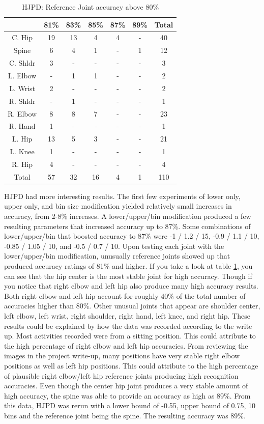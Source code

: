 \documentclass[11pt,nocopyrightspace]{config}
\begin{document}
\begin{table}[t]
\caption{HJPD: Reference Joint accuracy above 80\%}
\centering
\begin{tabular}{c c c c c c c}
\hline\hline
 & 81\% & 83\% & 85\% & 87\% & 89\% & Total \\ [0.5ex]
\hline
C. Hip & 19 & 13 & 4 & 4 & - & 40 \\
Spine & 6 & 4 & 1 & - & 1 & 12 \\
C. Shldr & 3 & - & - & - & - & 3 \\
L. Elbow & - & 1 & 1 & - & - & 2 \\
L. Wrist & 2 & - & - & - & - & 2 \\
R. Shldr & - & 1 & - & - & - & 1 \\
R. Elbow & 8 & 8 & 7 & - & - & 23 \\
R. Hand & 1 & - & - & - & - & 1 \\
L. Hip & 13 & 5 & 3 & - & - & 21 \\
L. Knee & 1 & - & - & - & - & 1 \\
R. Hip & 4 & - & - & - & - & 4 \\
\hline\hline
Total & 57 & 32 & 16 &  4 & 1 & 110 \\
\hline
\end{tabular}
\label{table:hjpdResult}
\end{table}

HJPD had more interesting results. The first few experiments of lower only, upper only, and bin size modification yielded relatively small increases in accuracy, from 2-8\% increases. A lower/upper/bin modification produced a few resulting parameters that increased accuracy up to 87\%. Some combinations of lower/upper/bin that boosted accuracy to 87\% were -1 / 1.2 / 15, -0.9 / 1.1 / 10, -0.85 / 1.05 / 10, and -0.5 / 0.7 / 10. Upon testing each joint with the lower/upper/bin modification, unusually reference joints showed up that produced accuracy ratings of 81\% and higher. If you take a look at table \ref{table:hjpdResult}, you can see that the hip center is the most stable joint for high accuracy. Though if you notice that right elbow and left hip also produce many high accuracy results. Both right elbow and left hip account for roughly 40\% of the total number of accuracies higher than 80\%. Other unusual joints that appear are shoulder center, left elbow, left wrist, right shoulder, right hand, left knee, and right hip. These results could be explained by how the data was recorded according to the write up. Most activities recorded were from a sitting position. This could attribute to the high percentage of right elbow and left hip accuracies. From reviewing the images in the project write-up, many positions have very stable right elbow positions as well as left hip positions. This could attribute to the high percentage of plausible right elbow/left hip reference joints producing high recognition accuracies. Even though the center hip joint produces a very stable amount of high accuracy, the spine was able to provide an accuracy as high as 89\%. From this data, HJPD was rerun with a lower bound of -0.55, upper bound of 0.75, 10 bins and the reference joint being the spine. The resulting accuracy was 89\%.
\end{document}
